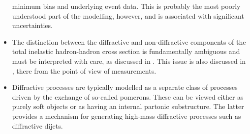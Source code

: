 \begin{itemize}
  minimum bias and underlying event data.
  This is probably the most poorly understood part
  of the modelling, however, and is associated with significant
  uncertainties.
\item The distinction between the  diffractive and non-diffractive
  components of the total inelastic hadron-hadron cross section is
  fundamentally ambiguous and must be interpreted with care, as discussed
  in . This issue is also discussed in
  , there from the point of view of
  measurements.
\item Diffractive processes are typically modelled as a separate class
  of processes driven by the exchange of so-called pomerons. These can
  be viewed either as purely soft objects or as having an internal
  partonic substructure. The latter provides a mechanism for
  generating high-mass diffractive processes such as diffractive dijets.
\end{itemize}
